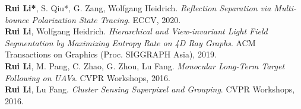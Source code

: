 


\textbf{Rui Li*}, S. Qiu*, G. Zang, Wolfgang Heidrich. \textit{Reflection Separation via Multi-bounce Polarization State Tracing}. ECCV, 2020. \\
\textbf{Rui Li}, Wolfgang Heidrich. \textit{Hierarchical and View-invariant Light Field Segmentation by Maximizing Entropy Rate on 4D Ray Graphs}.
ACM Transactions on Graphics (Proc. SIGGRAPH Asia), 2019. \\
\textbf{Rui Li}, M. Pang, C. Zhao, G. Zhou, Lu Fang. \textit{Monocular Long-Term Target Following on UAVs}. CVPR Workshops, 2016. \\
\textbf{Rui Li}, Lu Fang. \textit{Cluster Sensing Superpixel and Grouping}. CVPR Workshops, 2016. \\




